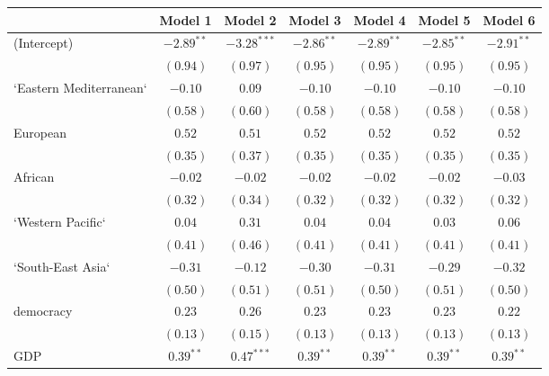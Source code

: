 
\begin{table}[!h]
\begin{center}
\begin{tabular}{l c c c c c c }
\toprule
 & Model 1 & Model 2 & Model 3 & Model 4 & Model 5 & Model 6 \\
\midrule
(Intercept)             & $-2.89^{**}$ & $-3.28^{***}$ & $-2.86^{**}$ & $-2.89^{**}$ & $-2.85^{**}$ & $-2.91^{**}$ \\
                        & $(0.94)$     & $(0.97)$      & $(0.95)$     & $(0.95)$     & $(0.95)$     & $(0.95)$     \\
`Eastern Mediterranean` & $-0.10$      & $0.09$        & $-0.10$      & $-0.10$      & $-0.10$      & $-0.10$      \\
                        & $(0.58)$     & $(0.60)$      & $(0.58)$     & $(0.58)$     & $(0.58)$     & $(0.58)$     \\
European                & $0.52$       & $0.51$        & $0.52$       & $0.52$       & $0.52$       & $0.52$       \\
                        & $(0.35)$     & $(0.37)$      & $(0.35)$     & $(0.35)$     & $(0.35)$     & $(0.35)$     \\
African                 & $-0.02$      & $-0.02$       & $-0.02$      & $-0.02$      & $-0.02$      & $-0.03$      \\
                        & $(0.32)$     & $(0.34)$      & $(0.32)$     & $(0.32)$     & $(0.32)$     & $(0.32)$     \\
`Western Pacific`       & $0.04$       & $0.31$        & $0.04$       & $0.04$       & $0.03$       & $0.06$       \\
                        & $(0.41)$     & $(0.46)$      & $(0.41)$     & $(0.41)$     & $(0.41)$     & $(0.41)$     \\
`South-East Asia`       & $-0.31$      & $-0.12$       & $-0.30$      & $-0.31$      & $-0.29$      & $-0.32$      \\
                        & $(0.50)$     & $(0.51)$      & $(0.51)$     & $(0.50)$     & $(0.51)$     & $(0.50)$     \\
democracy               & $0.23$       & $0.26$        & $0.23$       & $0.23$       & $0.23$       & $0.22$       \\
                        & $(0.13)$     & $(0.15)$      & $(0.13)$     & $(0.13)$     & $(0.13)$     & $(0.13)$     \\
GDP                     & $0.39^{**}$  & $0.47^{***}$  & $0.39^{**}$  & $0.39^{**}$  & $0.39^{**}$  & $0.39^{**}$  \\

\end{tabular}
\end{center}
\end{table}
